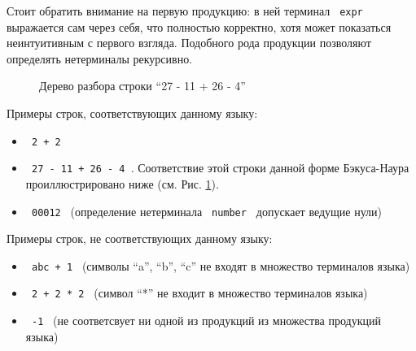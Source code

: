 Стоит обратить внимание на первую продукцию: в ней терминал \texttt{ expr } выражается сам через себя, что полностью корректно, хотя может показаться неинтуитивным с первого взгляда. Подобного рода продукции позволяют определять нетерминалы рекурсивно.

\begin{figure}[ht]
\begin{center}
\caption{
\label{lit:bnf_ex_pic} Дерево разбора строки \enquote{27 - 11 + 26 - 4}
}
\end{center}
\end{figure}


Примеры строк, соответствующих данному языку:
\begin{itemize}
    \item \texttt{ 2 + 2 }
    \item \texttt{ 27 - 11 + 26 - 4 }. Соответствие этой строки данной форме Бэкуса-Наура проиллюстрировано ниже (см. Рис. \ref{lit:bnf_ex_pic}).
    \item \texttt{ 00012 } (определение нетерминала \texttt{ number } допускает ведущие нули)
\end{itemize}

Примеры строк, не соответствующих данному языку:
\begin{itemize}
    \item \texttt{ abc + 1 } (символы \enquote{a}, \enquote{b}, \enquote{c} не входят в множество терминалов языка)
    \item \texttt{ 2 + 2 * 2 } (символ \enquote{*} не входит в множество терминалов языка)
    \item \texttt{ -1 } (не соответсвует ни одной из продукций из множества продукций языка)
\end{itemize}


